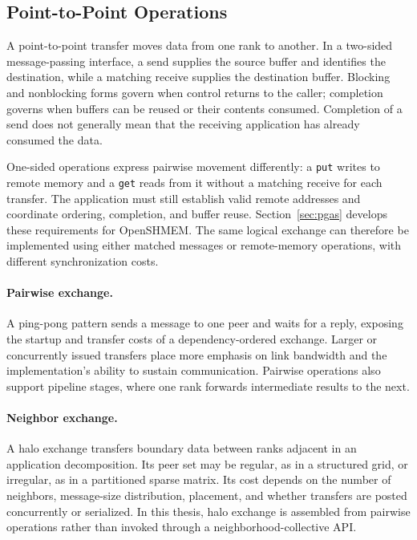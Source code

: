 \subsection{Point-to-Point Operations}\label{sec:point-to-point}

A point-to-point transfer moves data from one rank to another. In a two-sided message-passing interface, a send supplies the source buffer and identifies the destination, while a matching receive supplies the destination buffer. Blocking and nonblocking forms govern when control returns to the caller; completion governs when buffers can be reused or their contents consumed. Completion of a send does not generally mean that the receiving application has already consumed the data.

One-sided operations express pairwise movement differently: a \texttt{put} writes to remote memory and a \texttt{get} reads from it without a matching receive for each transfer. The application must still establish valid remote addresses and coordinate ordering, completion, and buffer reuse. Section~\ref{sec:pgas} develops these requirements for OpenSHMEM. The same logical exchange can therefore be implemented using either matched messages or remote-memory operations, with different synchronization costs.

\paragraph{Pairwise exchange.} A ping-pong pattern sends a message to one peer and waits for a reply, exposing the startup and transfer costs of a dependency-ordered exchange. Larger or concurrently issued transfers place more emphasis on link bandwidth and the implementation's ability to sustain communication. Pairwise operations also support pipeline stages, where one rank forwards intermediate results to the next.

\paragraph{Neighbor exchange.} A halo exchange transfers boundary data between ranks adjacent in an application decomposition. Its peer set may be regular, as in a structured grid, or irregular, as in a partitioned sparse matrix. Its cost depends on the number of neighbors, message-size distribution, placement, and whether transfers are posted concurrently or serialized. In this thesis, halo exchange is assembled from pairwise operations rather than invoked through a neighborhood-collective API.

